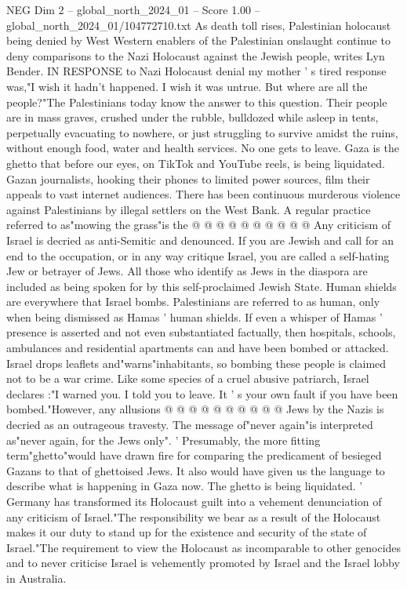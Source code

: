 \begin{textsample}{NEG Dim 2 – global\_north\_2024\_01 – Score 1.00 – global\_north\_2024\_01/104772710.txt}  \label{ex:f2_neg_337}
As death toll rises, Palestinian holocaust being denied by West Western enablers of the Palestinian onslaught continue to deny comparisons to the Nazi Holocaust against the Jewish people, writes Lyn Bender.
IN RESPONSE to Nazi Holocaust denial my mother ' s tired response was,"I wish it hadn't happened.
I wish it was untrue.
But where are all the people?"The Palestinians today know the answer to this question.
Their people are in mass graves, crushed under the rubble, bulldozed while asleep in tents, perpetually evacuating to nowhere, or just struggling to survive amidst the ruins, without enough food, water and health services.
No one gets to leave.
Gaza is the ghetto that before our eyes, on TikTok and YouTube reels, is being liquidated.
Gazan journalists, hooking their phones to limited power sources, film their appeals to vast internet audiences.
There has been continuous murderous violence against Palestinians by illegal settlers on the West Bank.
A regular practice referred to as"mowing the grass"is the @ @ @ @ @ @ @ @ @ @ Any criticism of Israel is decried as anti-Semitic and denounced.
If you are Jewish and call for an end to the occupation, or in any way critique Israel, you are called a self-hating Jew or betrayer of Jews.
All those who identify as Jews in the diaspora are included as being spoken for by this self-proclaimed Jewish State.
Human shields are everywhere that Israel bombs.
Palestinians are referred to as human, only when being dismissed as Hamas ' human shields.
If even a whisper of Hamas ' presence is asserted and not even substantiated factually, then hospitals, schools, ambulances and residential apartments can and have been bombed or attacked.
Israel drops leaflets and"warns"inhabitants, so bombing these people is claimed not to be a war crime.
Like some species of a cruel abusive patriarch, Israel declares :"I warned you.
I told you to leave.
It ' s your own fault if you have been bombed."However, any allusions @ @ @ @ @ @ @ @ @ @ Jews by the Nazis is decried as an outrageous travesty.
The message of"never again"is interpreted as"never again, for the Jews only". ' Presumably, the more fitting term"ghetto"would have drawn fire for comparing the predicament of besieged Gazans to that of ghettoised Jews.
It also would have given us the language to describe what is happening in Gaza now.
The ghetto is being liquidated. ' Germany has transformed its Holocaust guilt into a vehement denunciation of any criticism of Israel."The responsibility we bear as a result of the Holocaust makes it our duty to stand up for the existence and security of the state of Israel."The requirement to view the Holocaust as incomparable to other genocides and to never criticise Israel is vehemently promoted by Israel and the Israel lobby in Australia.

\end{textsample}
